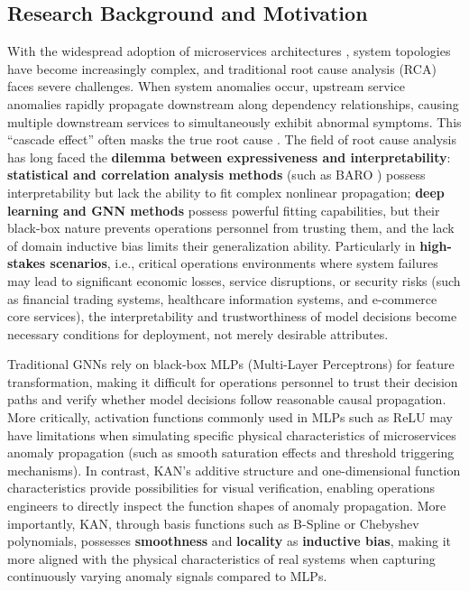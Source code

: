 \documentclass[conference]{IEEEtran}
\begin{document}
\subsection{Research Background and Motivation}

With the widespread adoption of microservices architectures \cite{microservices_survey}, system topologies have become increasingly complex, and traditional root cause analysis (RCA) faces severe challenges. When system anomalies occur, upstream service anomalies rapidly propagate downstream along dependency relationships, causing multiple downstream services to simultaneously exhibit abnormal symptoms. This ``cascade effect'' often masks the true root cause \cite{train_ticket}. The field of root cause analysis has long faced the \textbf{dilemma between expressiveness and interpretability}: \textbf{statistical and correlation analysis methods} (such as BARO \cite{baro2023}) possess interpretability but lack the ability to fit complex nonlinear propagation; \textbf{deep learning and GNN methods} possess powerful fitting capabilities, but their black-box nature prevents operations personnel from trusting them, and the lack of domain inductive bias limits their generalization ability. Particularly in \textbf{high-stakes scenarios}, i.e., critical operations environments where system failures may lead to significant economic losses, service disruptions, or security risks (such as financial trading systems, healthcare information systems, and e-commerce core services), the interpretability and trustworthiness of model decisions become necessary conditions for deployment, not merely desirable attributes.

Traditional GNNs rely on black-box MLPs (Multi-Layer Perceptrons) for feature transformation, making it difficult for operations personnel to trust their decision paths and verify whether model decisions follow reasonable causal propagation. More critically, activation functions commonly used in MLPs such as ReLU may have limitations when simulating specific physical characteristics of microservices anomaly propagation (such as smooth saturation effects and threshold triggering mechanisms). In contrast, KAN's additive structure and one-dimensional function characteristics provide possibilities for visual verification, enabling operations engineers to directly inspect the function shapes of anomaly propagation. More importantly, KAN, through basis functions such as B-Spline or Chebyshev polynomials, possesses \textbf{smoothness} and \textbf{locality} as \textbf{inductive bias}, making it more aligned with the physical characteristics of real systems when capturing continuously varying anomaly signals compared to MLPs.
\end{document}
